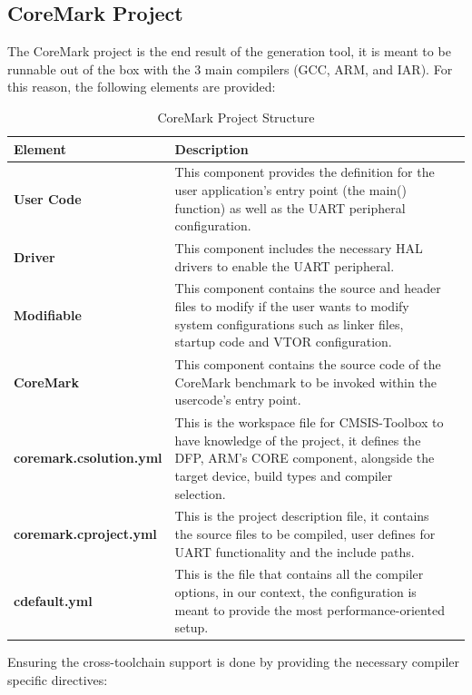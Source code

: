 \subsection{CoreMark Project}
The CoreMark project is the end result of the generation tool, it is meant to be runnable out of the box with the 3 main compilers (GCC, ARM, and IAR).
For this reason, the following elements are provided:
\begin{table}[htbp]
   \centering 
   \caption{CoreMark Project Structure}
   \begin{tabularx}{\linewidth}{@{}>{\bfseries}l X X@{}}
    \toprule
    Element & Description \\
    \midrule
    User Code & This component provides the definition for the user application's entry point (the main() function) as well as the UART peripheral configuration. \\
    \midrule
    Driver & This component includes the necessary HAL drivers to enable the UART peripheral. \\
    \midrule
    Modifiable & This component contains the source and header files to modify if the user wants to modify system configurations such as linker files, startup code and VTOR configuration. \\
    \midrule
    CoreMark & This component contains the source code of the CoreMark benchmark to be invoked within the usercode's entry point. \\
    \midrule
    coremark.csolution.yml & This is the workspace file for CMSIS-Toolbox to have knowledge of the project, it defines the DFP, ARM's CORE component, alongside the target device, build types and compiler selection. \\
    \midrule
    coremark.cproject.yml & This is the project description file, it contains the source files to be compiled, user defines for UART functionality and the include paths. \\
    \midrule
    cdefault.yml & This is the file that contains all the compiler options, in our context, the configuration is meant to provide the most performance-oriented setup. \\
    \bottomrule
   \end{tabularx}
\end{table}
Ensuring the cross-toolchain support is done by providing the necessary compiler specific directives:
